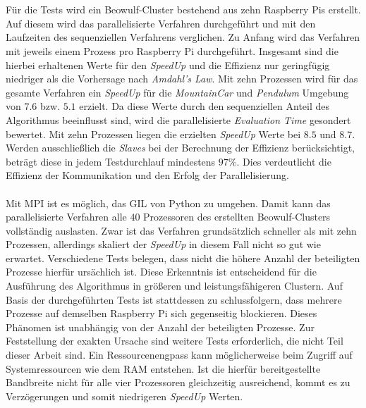 \\\\
Für die Tests wird ein Beowulf-Cluster bestehend aus zehn Raspberry Pis erstellt. Auf diesem wird das parallelisierte Verfahren durchgeführt und mit den Laufzeiten des sequenziellen Verfahrens verglichen. Zu Anfang wird das Verfahren mit jeweils einem Prozess pro Raspberry Pi durchgeführt. Insgesamt sind die hierbei erhaltenen Werte für den \emph{SpeedUp} und die Effizienz nur geringfügig niedriger als die Vorhersage nach \emph{Amdahl's Law}. Mit zehn Prozessen wird für das gesamte Verfahren ein \emph{SpeedUp} für die \emph{MountainCar} und \emph{Pendulum} Umgebung von $7.6$ bzw. $5.1$ erzielt. Da diese Werte durch den sequenziellen Anteil des Algorithmus beeinflusst sind, wird die parallelisierte \emph{Evaluation Time} gesondert bewertet. Mit zehn Prozessen liegen die erzielten \emph{SpeedUp} Werte bei $8.5$ und $8.7$. Werden ausschließlich die \emph{Slaves} bei der Berechnung der Effizienz berücksichtigt, beträgt diese in jedem Testdurchlauf mindestens $97\%$. Dies verdeutlicht die Effizienz der Kommunikation und den Erfolg der Parallelisierung.
\\\\
Mit \ac{MPI} ist es möglich, das \ac{GIL} von Python zu umgehen. Damit kann das parallelisierte Verfahren alle $40$ Prozessoren des erstellten Beowulf-Clusters vollständig auslasten. Zwar ist das Verfahren grundsätzlich schneller als mit zehn Prozessen, allerdings skaliert der \emph{SpeedUp} in diesem Fall nicht so gut wie erwartet. Verschiedene Tests belegen, dass nicht die höhere Anzahl der beteiligten Prozesse hierfür ursächlich ist. Diese Erkenntnis ist entscheidend für die Ausführung des Algorithmus in größeren und leistungsfähigeren Clustern. Auf Basis der durchgeführten Tests ist stattdessen zu schlussfolgern, dass mehrere Prozesse auf demselben Raspberry Pi sich gegenseitig blockieren. Dieses Phänomen ist unabhängig von der Anzahl der beteiligten Prozesse. Zur Feststellung der exakten Ursache sind weitere Tests erforderlich, die nicht Teil dieser Arbeit sind. Ein Ressourcenengpass kann möglicherweise beim Zugriff auf Systemressourcen wie dem \ac{RAM} entstehen. Ist die hierfür bereitgestellte Bandbreite nicht für alle vier Prozessoren gleichzeitig ausreichend, kommt es zu Verzögerungen und somit niedrigeren \emph{SpeedUp} Werten. 
\\\\
